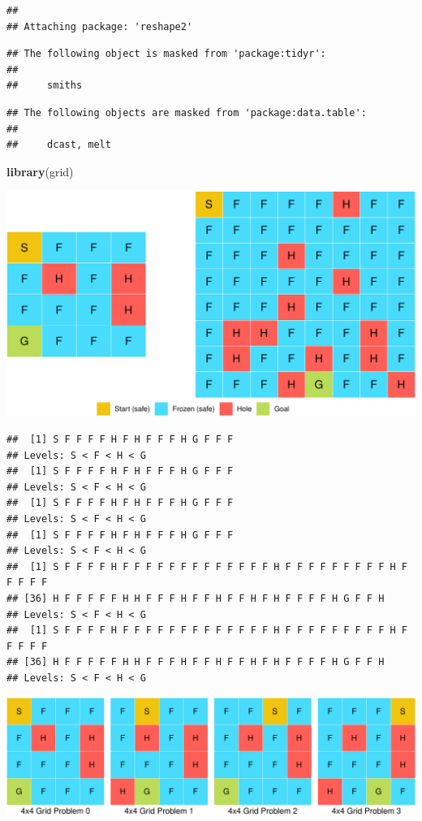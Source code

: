 \documentclass[11pt,]{article}
\newenvironment{Shaded}{\begin{snugshade}}{\end{snugshade}}
\newcommand{\KeywordTok}[1]{\textcolor[rgb]{0.13,0.29,0.53}{\textbf{#1}}}
\newcommand{\NormalTok}[1]{#1}
\begin{document}
\begin{verbatim}
## 
## Attaching package: 'reshape2'
\end{verbatim}

\begin{verbatim}
## The following object is masked from 'package:tidyr':
## 
##     smiths
\end{verbatim}

\begin{verbatim}
## The following objects are masked from 'package:data.table':
## 
##     dcast, melt
\end{verbatim}

\begin{Shaded}
\begin{Highlighting}[]
\KeywordTok{library}\NormalTok{(grid)}
\end{Highlighting}
\end{Shaded}

\begin{center}\includegraphics[width=0.7\linewidth]{project_files/figure-latex/lake-1} \end{center}

\begin{verbatim}
##  [1] S F F F F H F H F F F H G F F F
## Levels: S < F < H < G
##  [1] S F F F F H F H F F F H G F F F
## Levels: S < F < H < G
##  [1] S F F F F H F H F F F H G F F F
## Levels: S < F < H < G
##  [1] S F F F F H F H F F F H G F F F
## Levels: S < F < H < G
##  [1] S F F F F H F F F F F F F F F F F F F H F F F F F F F F F H F F F F F
## [36] H F F F F F H H F F F H F F H F F H F H F F F F H G F F H
## Levels: S < F < H < G
##  [1] S F F F F H F F F F F F F F F F F F F H F F F F F F F F F H F F F F F
## [36] H F F F F F H H F F F H F F H F F H F H F F F F H G F F H
## Levels: S < F < H < G
\end{verbatim}

\begin{center}\includegraphics[width=0.9\linewidth]{project_files/figure-latex/lakes-1} \end{center}
\end{document}
